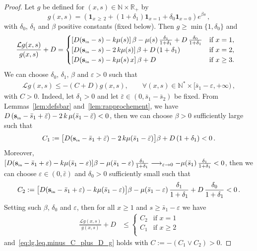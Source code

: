 \documentclass[10pt]{amsart}
\theoremstyle{definition}\newtheorem{defi}[theo]{Definition}\newtheorem{rema}[theo]{Remark}\newtheorem{exam}[theo]{Example}\newtheorem{exem}[theo]{Example}\newtheorem{nota}[theo]{Notation}
\newcommand{\RR}{\mathbb{R}}
\newcommand{\NN}{\mathbb{N}}
\newcommand{\clL}{\mathcal{L}}
\newcommand{\Sin}{{\mathbf s}_{\textrm{\tiny\rm in}}}
\newcommand{\1}{\mathbf{1}}
\let\oldforall\forall
\renewcommand*{\forall}{\mathrel{\oldforall}}
\begin{document}
\begin{proof}
Let $g$ be defined for $(x,s)\in \NN\times \RR_+$ by
\[
g(x,s) = \left(\1_{x\,\geq\,2} + (1+\delta_1) \1_{x=1} +\delta_0 \1_{x=0} \right) e^{\beta s}\,,
\]
with $\delta_0$, $\delta_1$ and $\beta$ positive constants (fixed below). Then $g\geq \min\{1,\delta_0\}$ and
\begin{align*}
\frac{\clL g(x,s)}{g(x,s)} + D &=
\begin{cases}
\left[D(\Sin-s) - k \mu(s)\right] \beta - \mu(s)\, \frac{\delta_1}{1+\delta_1} + D\, \frac{\delta_0}{1+\delta_1}& \text{if } x = 1,\\
\left[D(\Sin-s) -2\, k \mu(s)\right] \beta + D\,(1+\delta_1) & \text{if } x=2,\\
\left[D(\Sin-s) - k \mu(s)\,x\right] \beta +D & \text{if } x\geq 3.
\end{cases}
\end{align*}
We can choose $\delta_0$, $\delta_1$, $\beta$ and $\varepsilon>0$ such that
\begin{align}\label{eq:lg.leq.minus_C_plus_D_g}
\clL g(x,s) \leq -(C+ D) g(x,s), \qquad \forall (x,s)\in \NN^*\times [\bar s_1-\varepsilon,+\infty)\,,
\end{align}
with $C>0$. Indeed, let $\delta_1>0$ and let $\bar \varepsilon\in (0,\bar s_1 - \bar s_2)$ be fixed. From Lemmas~\ref{lem:defsbar} and~\ref{lem:rapprochement}, we have $D\,(\Sin-\bar s_1+\bar \varepsilon)- 2\,k\,\mu(\bar s_1-\bar \varepsilon)<0$, then we can choose $\beta>0$ sufficiently large such that
\[
C_1 :=\big[D(\Sin-\bar s_1+\bar \varepsilon) -2\, k \mu(\bar s_1-\bar \varepsilon)\big] \beta + D\,(1+\delta_1) <0\,.
\]
Moreover, $[D(\Sin-\bar s_1+\varepsilon) - k \mu(\bar s_1-\varepsilon)] \beta - \mu(\bar s_1-\varepsilon)\, \frac{\delta_1}{1+\delta_1} \longrightarrow_{\varepsilon\to 0}- \mu(\bar s_1)\, \frac{\delta_1}{1+\delta_1}<0$, then we can choose $\varepsilon \in (0, \bar \varepsilon)$ and $\delta_0>0$ sufficiently small such that
\[
C_2 := \big[D(\Sin-\bar s_1+\varepsilon) - k \mu(\bar s_1-\varepsilon)\big] \beta - \mu(\bar s_1-\varepsilon)\, \frac{\delta_1}{1+\delta_1} + D\, \frac{\delta_0}{1+\delta_1}<0\,.
\]
Setting such $\beta$, $\delta_0$ and $\varepsilon$, then for all $x\geq 1$ and $s \geq \bar s_1-\varepsilon$ we have
\begin{align*}
\frac{\clL g(x,s)}{g(x,s)} + D &\leq
\begin{cases}
C_2 & \text{if } x = 1\\
C_1 & \text{if } x\geq 2\\
\end{cases}
\end{align*}
and~\eqref{eq:lg.leq.minus_C_plus_D_g} holds with $C:=-(C_1\vee C_2)>0$.



\end{proof}
\end{document}
